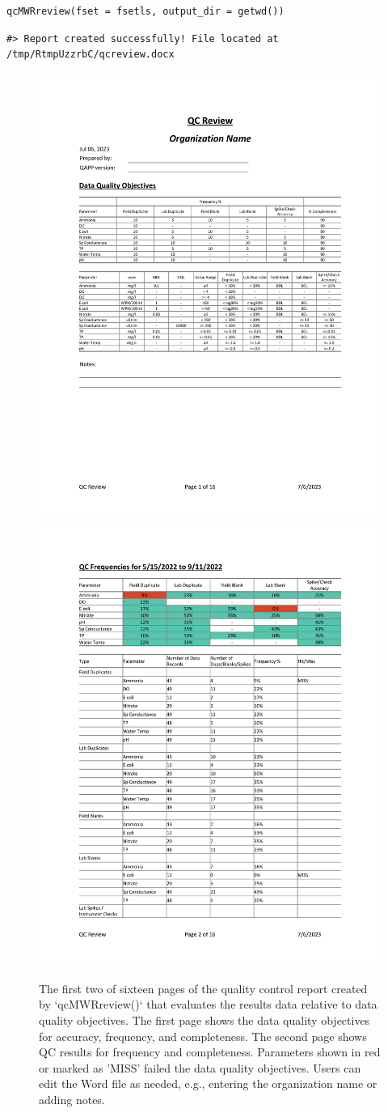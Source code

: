 \begin{verbatim}
qcMWRreview(fset = fsetls, output_dir = getwd())
\end{verbatim}

\begin{verbatim}
#> Report created successfully! File located at /tmp/RtmpUzzrbC/qcreview.docx
\end{verbatim}

\begin{figure}
\includegraphics[width=0.5\linewidth]{figs/qcreview1} \includegraphics[width=0.5\linewidth]{figs/qcreview2} \caption{The first two of sixteen pages of the quality control report created by `qcMWRreview()` that evaluates the results data relative to data quality objectives.  The first page shows the data quality objectives for accuracy, frequency, and completeness.  The second page shows QC results for frequency and completeness.  Parameters shown in red or marked as 'MISS' failed the data quality objectives.  Users can edit the Word file as needed, e.g., entering the organization name or adding notes.}\label{fig:qcex}
\end{figure}

